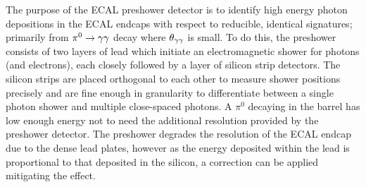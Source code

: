 The purpose of the ECAL preshower detector is to identify high energy photon depositions in the ECAL endcaps with respect to reducible, identical signatures; primarily from $\pi^{0}\rightarrow\gamma{}\gamma{}$ decay where $\theta_{\gamma{}\gamma{}}$ is small. 
To do this, the preshower consists of two layers of lead which initiate an electromagnetic shower for photons (and electrons), each closely followed by a layer of silicon strip detectors. 
The silicon strips are placed orthogonal to each other to measure shower positions precisely and are fine enough in granularity to differentiate between a single photon shower and multiple close-spaced photons.
A $\pi^{0}$ decaying in the barrel has low enough energy not to need the additional resolution provided by the preshower detector. 
The preshower degrades the resolution of the ECAL endcap due to the dense lead plates, however as the energy deposited within the lead is proportional to that deposited in the silicon, a correction can be applied mitigating the effect.

